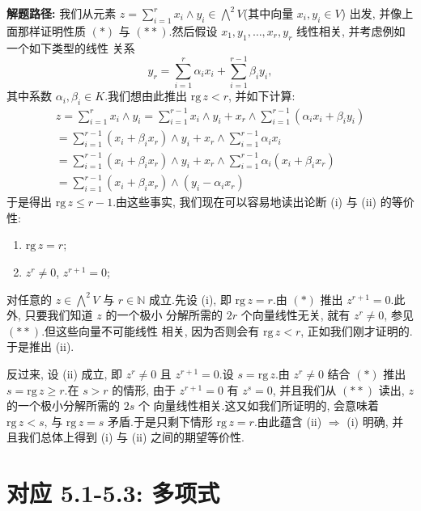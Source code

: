 \noindent\textbf{解题路径:} 我们从元素 $z = \sum_{i=1}^{r} x_i \wedge y_i \in
\bigwedge^2 V$(其中向量 $x_i, y_i \in V$) 出发, 并像上面那样证明性质 $(*)$ 与
$(**)$.然后假设 $x_1, y_1, \ldots, x_r, y_r$ 线性相关, 并考虑例如一个如下类型的线性
关系
\[
y_r = \sum_{i=1}^{r} \alpha_i x_i + \sum_{i=1}^{r-1} \beta_i y_i,
\]
其中系数 $\alpha_i, \beta_i \in K$.我们想由此推出 $\mathrm{rg}\, z < r$, 并如下计算:
\[
\begin{array}{l}
z = \sum_{i=1}^{r} x_i \wedge y_i = \sum_{i=1}^{r-1} x_i \wedge y_i + x_r \wedge \sum_{i=1}^{r-1} (\alpha_i x_i + \beta_i y_i) \\
= \sum_{i=1}^{r-1} (x_i + \beta_i x_r) \wedge y_i + x_r \wedge \sum_{i=1}^{r-1} \alpha_i x_i \\
= \sum_{i=1}^{r-1} (x_i + \beta_i x_r) \wedge y_i + x_r \wedge \sum_{i=1}^{r-1} \alpha_i (x_i + \beta_i x_r) \\
= \sum_{i=1}^{r-1} (x_i + \beta_i x_r) \wedge (y_i - \alpha_i x_r)
\end{array}
\]
于是得出 $\mathrm{rg}\, z \leq r - 1$.由这些事实, 我们现在可以容易地读出论断 (i) 与
(ii) 的等价性:
\begin{enumerate}
\item[(i)] $\mathrm{rg}\, z = r$;
\item[(ii)] $z^r \neq 0$, $z^{r+1} = 0$;
\end{enumerate}
对任意的 $z \in \bigwedge^2 V$ 与 $r \in \mathbb{N}$ 成立.先设 (i), 即
$\mathrm{rg}\, z = r$.由 $(*)$ 推出 $z^{r+1} = 0$.此外, 只要我们知道 $z$ 的一个极小
分解所需的 $2r$ 个向量线性无关, 就有 $z^r \neq 0$, 参见 $(**)$.但这些向量不可能线性
相关, 因为否则会有 $\mathrm{rg}\, z < r$, 正如我们刚才证明的.于是推出 (ii).

反过来, 设 (ii) 成立, 即 $z^r \neq 0$ 且 $z^{r+1} = 0$.设 $s = \mathrm{rg}\, z$.由
$z^r \neq 0$ 结合 $(*)$ 推出 $s = \mathrm{rg}\, z \geq r$.在 $s > r$ 的情形, 由于
$z^{r+1} = 0$ 有 $z^s = 0$, 并且我们从 $(**)$ 读出, $z$ 的一个极小分解所需的 $2s$ 个
向量线性相关.这又如我们所证明的, 会意味着 $\mathrm{rg}\, z < s$, 与 $\mathrm{rg}\, z
= s$ 矛盾.于是只剩下情形 $\mathrm{rg}\, z = r$.由此蕴含 (ii) $\Longrightarrow$ (i)
明确, 并且我们总体上得到 (i) 与 (ii) 之间的期望等价性.


\section*{对应 5.1-5.3: 多项式}

